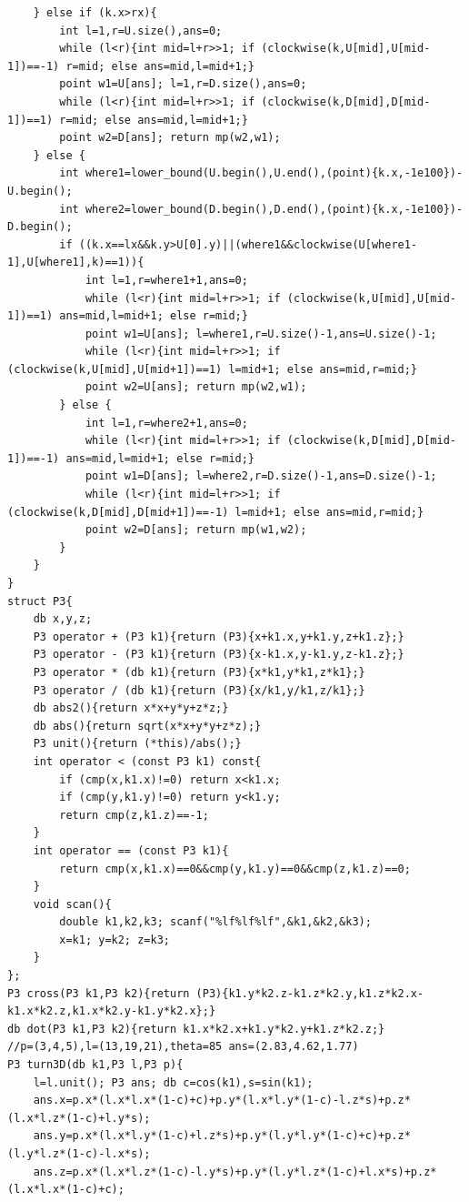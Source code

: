 \documentclass[twoside]{article}
\begin{document}
\begin{lstlisting}
    } else if (k.x>rx){
        int l=1,r=U.size(),ans=0;
        while (l<r){int mid=l+r>>1; if (clockwise(k,U[mid],U[mid-1])==-1) r=mid; else ans=mid,l=mid+1;}
        point w1=U[ans]; l=1,r=D.size(),ans=0;
        while (l<r){int mid=l+r>>1; if (clockwise(k,D[mid],D[mid-1])==1) r=mid; else ans=mid,l=mid+1;}
        point w2=D[ans]; return mp(w2,w1);
    } else {
        int where1=lower_bound(U.begin(),U.end(),(point){k.x,-1e100})-U.begin();
        int where2=lower_bound(D.begin(),D.end(),(point){k.x,-1e100})-D.begin();
        if ((k.x==lx&&k.y>U[0].y)||(where1&&clockwise(U[where1-1],U[where1],k)==1)){
            int l=1,r=where1+1,ans=0;
            while (l<r){int mid=l+r>>1; if (clockwise(k,U[mid],U[mid-1])==1) ans=mid,l=mid+1; else r=mid;}
            point w1=U[ans]; l=where1,r=U.size()-1,ans=U.size()-1;
            while (l<r){int mid=l+r>>1; if (clockwise(k,U[mid],U[mid+1])==1) l=mid+1; else ans=mid,r=mid;}
            point w2=U[ans]; return mp(w2,w1);
        } else {
            int l=1,r=where2+1,ans=0;
            while (l<r){int mid=l+r>>1; if (clockwise(k,D[mid],D[mid-1])==-1) ans=mid,l=mid+1; else r=mid;}
            point w1=D[ans]; l=where2,r=D.size()-1,ans=D.size()-1;
            while (l<r){int mid=l+r>>1; if (clockwise(k,D[mid],D[mid+1])==-1) l=mid+1; else ans=mid,r=mid;}
            point w2=D[ans]; return mp(w1,w2);
        }
    }
}
struct P3{
    db x,y,z;
    P3 operator + (P3 k1){return (P3){x+k1.x,y+k1.y,z+k1.z};}
    P3 operator - (P3 k1){return (P3){x-k1.x,y-k1.y,z-k1.z};}
    P3 operator * (db k1){return (P3){x*k1,y*k1,z*k1};}
    P3 operator / (db k1){return (P3){x/k1,y/k1,z/k1};}
    db abs2(){return x*x+y*y+z*z;}
    db abs(){return sqrt(x*x+y*y+z*z);}
    P3 unit(){return (*this)/abs();}
    int operator < (const P3 k1) const{
        if (cmp(x,k1.x)!=0) return x<k1.x;
        if (cmp(y,k1.y)!=0) return y<k1.y;
        return cmp(z,k1.z)==-1;
    }
    int operator == (const P3 k1){
        return cmp(x,k1.x)==0&&cmp(y,k1.y)==0&&cmp(z,k1.z)==0;
    }
    void scan(){
        double k1,k2,k3; scanf("%lf%lf%lf",&k1,&k2,&k3);
        x=k1; y=k2; z=k3;
    }
};
P3 cross(P3 k1,P3 k2){return (P3){k1.y*k2.z-k1.z*k2.y,k1.z*k2.x-k1.x*k2.z,k1.x*k2.y-k1.y*k2.x};}
db dot(P3 k1,P3 k2){return k1.x*k2.x+k1.y*k2.y+k1.z*k2.z;}
//p=(3,4,5),l=(13,19,21),theta=85 ans=(2.83,4.62,1.77)
P3 turn3D(db k1,P3 l,P3 p){
    l=l.unit(); P3 ans; db c=cos(k1),s=sin(k1);
    ans.x=p.x*(l.x*l.x*(1-c)+c)+p.y*(l.x*l.y*(1-c)-l.z*s)+p.z*(l.x*l.z*(1-c)+l.y*s);
    ans.y=p.x*(l.x*l.y*(1-c)+l.z*s)+p.y*(l.y*l.y*(1-c)+c)+p.z*(l.y*l.z*(1-c)-l.x*s);
    ans.z=p.x*(l.x*l.z*(1-c)-l.y*s)+p.y*(l.y*l.z*(1-c)+l.x*s)+p.z*(l.x*l.x*(1-c)+c);

\end{lstlisting}
\end{document}
